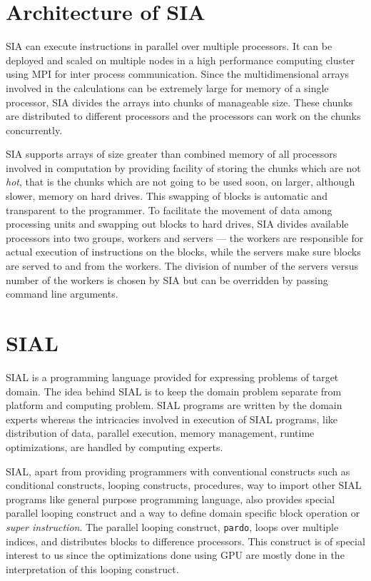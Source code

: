 \section{Architecture of SIA}\label{siaarch}
SIA can execute instructions in parallel over multiple processors. It can be
deployed and scaled on multiple nodes in a high performance computing cluster
using MPI for inter process communication. Since the
multidimensional arrays involved in the calculations can be extremely large for
memory of a single processor, SIA divides the arrays into chunks of
manageable size. These chunks are distributed to different processors and the
processors can work on the chunks concurrently.

SIA supports arrays of size greater than combined memory of all processors
involved in computation by providing facility of storing the chunks which are
not \textit{hot}, that is the chunks which are not going to be used soon, on
larger, although slower, memory on hard drives. This swapping of blocks is automatic
and transparent to the programmer. To facilitate the movement of data among
processing units and swapping out blocks to hard drives, SIA divides available
processors into two groups, workers and servers --- the workers are responsible for
actual execution of instructions on the blocks, while the servers make sure blocks
are served to and from the workers. The division of number of the servers versus number
of the workers is chosen by SIA but can be overridden by passing command line
arguments.

\section{SIAL}
SIAL is a programming language provided for expressing problems of target
domain. The idea behind SIAL is to keep the domain problem separate from
platform and computing problem. SIAL programs are written by the domain experts
whereas the intricacies involved in execution of SIAL programs, like distribution of
data, parallel execution, memory management, runtime optimizations, are handled
by computing experts.

SIAL, apart from providing programmers with conventional constructs such as
conditional constructs, looping constructs, procedures, way to import other SIAL
programs like general purpose programming language, also provides special parallel looping construct and a way
to define domain specific block operation or \textit{super instruction}. The
parallel looping construct, \texttt{pardo}, loops over multiple indices, and
distributes blocks to difference processors. This construct is of special
interest to us since the optimizations done using GPU are mostly done in the
interpretation of this looping construct.


